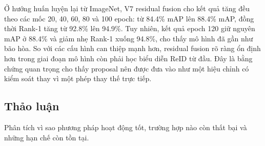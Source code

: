 Ở hướng huấn luyện lại từ ImageNet, V7 residual fusion cho kết quả tăng đều theo các mốc 20, 40, 60, 80 và 100 epoch: từ 84.4\% mAP lên 88.4\% mAP, đồng thời Rank-1 tăng từ 92.8\% lên 94.9\%. Tuy nhiên, kết quả epoch 120 giữ nguyên mAP ở 88.4\% và giảm nhẹ Rank-1 xuống 94.8\%, cho thấy mô hình đã gần như bão hòa. So với các cấu hình can thiệp mạnh hơn, residual fusion rõ ràng ổn định hơn trong giai đoạn mô hình còn phải học biểu diễn ReID từ đầu. Đây là bằng chứng quan trọng cho thấy proposal nên được đưa vào như một hiệu chỉnh có kiểm soát thay vì một phép thay thế trực tiếp.

\subsection{Thảo luận}
Phân tích vì sao phương pháp hoạt động tốt, trường hợp nào còn thất bại và
những hạn chế còn tồn tại.
